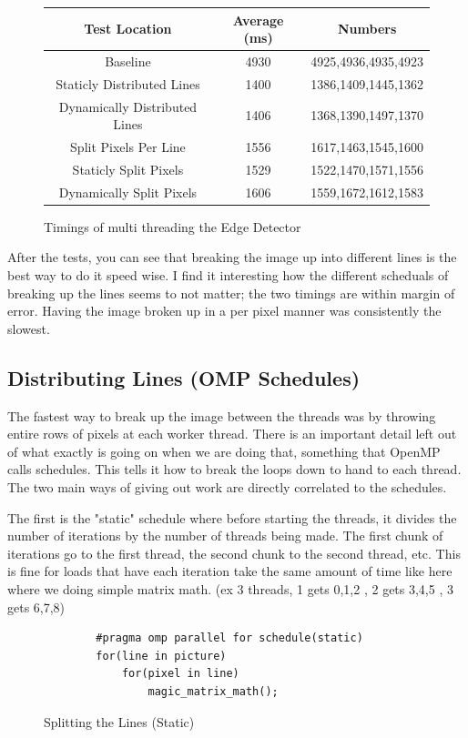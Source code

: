 \documentclass[12pt]{article}
\begin{document}
\begin{figure}[htb]
	\centering
	\begin{tabular}{|c|c|c|}
		\hline
		Test Location & Average (ms) & Numbers \\ \hline \hline
		Baseline & 4930 & 4925,4936,4935,4923 \\ \hline
		Staticly Distributed Lines & 1400 & 1386,1409,1445,1362 \\ \hline
		Dynamically Distributed Lines & 1406 & 1368,1390,1497,1370 \\ \hline
		Split Pixels Per Line & 1556 & 1617,1463,1545,1600 \\ \hline
		Staticly Split Pixels & 1529 & 1522,1470,1571,1556 \\ \hline
		Dynamically Split Pixels & 1606 & 1559,1672,1612,1583 \\ \hline
	\end{tabular}
	\caption{Timings of multi threading the Edge Detector}
\end{figure}

After the tests, you can see that breaking the image up into different lines is the best way to do it speed wise.
I find it interesting how the different scheduals of breaking up the lines seems to not matter; the two timings are within margin of error.
Having the image broken up in a per pixel manner was consistently the slowest.

\subsection{Distributing Lines (OMP Schedules)}

The fastest way to break up the image between the threads was by throwing entire rows of pixels at each worker thread.
There is an important detail left out of what exactly is going on when we are doing that, something that OpenMP calls schedules.
This tells it how to break the loops down to hand to each thread.
The two main ways of giving out work are directly correlated to the schedules.

The first is the "static" schedule where before starting the threads, it divides the number of iterations by the number of threads being made.
The first chunk of iterations go to the first thread, the second chunk to the second thread, etc.
This is fine for loads that have each iteration take the same amount of time like here where we doing simple matrix math.
(ex 3 threads, 1 gets 0,1,2 , 2 gets 3,4,5 , 3 gets 6,7,8)

\begin{figure}[htb]
	\centering
	\begin{verbatim}
		#pragma omp parallel for schedule(static)
		for(line in picture)
			for(pixel in line)
				magic_matrix_math();
	\end{verbatim}
	\vspace{-16pt}
	\caption{Splitting the Lines (Static)}
\end{figure}
\end{document}
